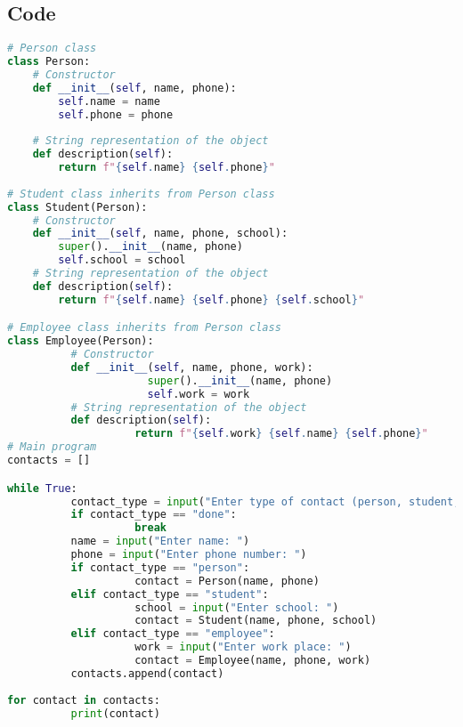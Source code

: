 \documentclass{article}
\begin{document}
\subsection{Code}
\begin{lstlisting}[language=python]
    # Person class
class Person:
    # Constructor      
    def __init__(self, name, phone):
        self.name = name
        self.phone = phone
        
    # String representation of the object    
    def description(self):
        return f"{self.name} {self.phone}"
 
# Student class inherits from Person class          
class Student(Person):
    # Constructor
    def __init__(self, name, phone, school):
        super().__init__(name, phone)
        self.school = school
    # String representation of the object    
    def description(self):
        return f"{self.name} {self.phone} {self.school}"

# Employee class inherits from Person class
class Employee(Person):
          # Constructor
          def __init__(self, name, phone, work):
                      super().__init__(name, phone)
                      self.work = work
          # String representation of the object            
          def description(self):
                    return f"{self.work} {self.name} {self.phone}"
# Main program
contacts = []

while True:
          contact_type = input("Enter type of contact (person, student, employee) or done: ").lower()
          if contact_type == "done":
                    break
          name = input("Enter name: ")
          phone = input("Enter phone number: ")
          if contact_type == "person":
                    contact = Person(name, phone)
          elif contact_type == "student":
                    school = input("Enter school: ")
                    contact = Student(name, phone, school)
          elif contact_type == "employee":
                    work = input("Enter work place: ")
                    contact = Employee(name, phone, work)
          contacts.append(contact)
          
for contact in contacts:
          print(contact)
\end{lstlisting}
\end{document}
